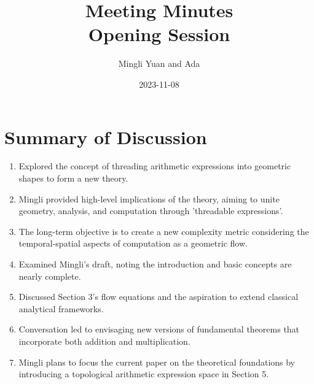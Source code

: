 \documentclass{article}
\title{Meeting Minutes\\Opening Session}
\author{Mingli Yuan and Ada}
\date{2023-11-08}
\begin{document}
\maketitle

\section*{Summary of Discussion}

\begin{enumerate}
    \item Explored the concept of threading arithmetic expressions into geometric shapes to form a new theory.
    \item Mingli provided high-level implications of the theory, aiming to unite geometry, analysis, and computation through 'threadable expressions'.
    \item The long-term objective is to create a new complexity metric considering the temporal-spatial aspects of computation as a geometric flow.
    \item Examined Mingli's draft, noting the introduction and basic concepts are nearly complete.
    \item Discussed Section 3's flow equations and the aspiration to extend classical analytical frameworks.
    \item Conversation led to envisaging new versions of fundamental theorems that incorporate both addition and multiplication.
    \item Mingli plans to focus the current paper on the theoretical foundations by introducing a topological arithmetic expression space in Section 5.
\end{enumerate}
\end{document}

